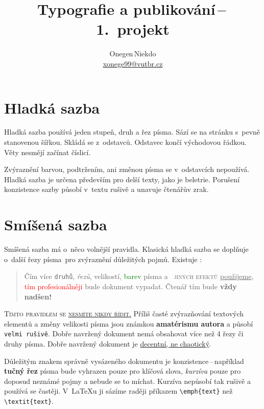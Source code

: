 \documentclass[a4paper, twocolumn, 10pt]{article}
\title{Typografie a publikování\,--\,1.\ projekt}
\author{Onegen\,Niekdo \\
    \href{mailto:xonege99@vutbr.cz}{xonege99@vutbr.cz}}
\date{}
\begin{document}
\maketitle

\section{Hladká sazba}

Hladká sazba používá jeden stupeň, druh a řez písma.
Sází se na stránku s~pevně stanovenou šířkou.
Skládá se z~odstavců. Odstavec končí východovou řádkou.
Věty nesmějí začínat číslicí.

Zvýraznění barvou, podtržením, ani změnou písma se v~odstavcích nepoužívá.
Hladká sazba je určena především pro delší texty, jako je beletrie.
Porušení konzistence sazby působí v~textu rušivě a unavuje čtenářův zrak.

\section{Smíšená sazba}
\label{sec:smisena}

Smíšená sazba má o~něco volnější pravidla. Klasická hladká
sazba se doplňuje o~další řezy písma~pro zvýraznění důležitých pojmů.
Existuje :

\begin{quotation}

	Čím více \texttt{druhů}, \textit{řezů}, {\tiny velikostí}, \textcolor{green}{barev} písma
	a~{\scshape\color{blue} jiných efektů} \underline{použijeme}, \textcolor{red}{tím profesionál\-něji}
	bude {\selectfont dokument} vypadat. Čtenář tím bude
		{\Huge \textbf{vždy nadšen!}}

\end{quotation}

{\scshape Tímto pravidlem se \underline{nesmíte nikdy řídit.}}
Příliš časté zvýrazňování textových elementů a změny {\scriptsize velikosti} písma
jsou známkou \textbf{amatérismu autora} a působí \texttt{velmi rušivě}.
Dobře navržený dokument nemá obsahovat více než 4 řezy či druhy písma.
Dobře navržený dokument je \underline{decentní, ne chaotický}.

Důležitým znakem správně vysázeného dokumentu je konzistence\,--\,například
\textbf{tučný řez} písma bude vyhrazen pouze pro klíčová slova,
\emph{kurzíva} pouze pro doposud neznámé pojmy a nebude se to míchat.
Kurzíva nepůsobí tak rušivě a používá se častěji.
V~\LaTeX{}u ji sázíme raději příkazem {\ttfamily \verb|\emph{text}|} než {\ttfamily \verb|\textit{text}|}.
\end{document}
